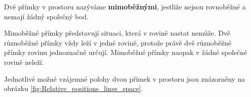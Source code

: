 \begin{definition}
    \label{def:Skew_lines_space}
    Dvě přímky v prostoru nazýváme \textbf{mimoběžnými}, jestliže
    nejsou rovnoběžné a nemají žádný společný bod.
\end{definition}

Mimoběžné přímky představují situaci, která v rovině nastat nemůže.
Dvě různoběžné přímky vždy leží v jedné rovině, protože právě dvě
různoběžné přímky rovinu jednoznačně určují. Mimoběžné přímky naopak
v žádné společné rovině neleží.

Jednotlivé možné vzájemné polohy dvou přímek v prostoru jsou
znázorněny na obrázku
\ref{fig:Relative_positions_lines_space}.

\begin{figure}[H]
    \centering


    \newcommand{\DrawSpaceBase}{%
        \fill[plane] (0,0,0) -- (5,0,0) -- (5,0,3.4) -- (0,0,3.4) -- cycle;
        \node[below right, font=\small] at (3.4,0,3.15) {rovina $xz$ $(y=0)$};

        \draw[->] (0,0,0) -- (5.6,0,0) node[right] {$x$};
        \draw[->] (0,0,0) -- (0,4.2,0) node[above] {$y$};
        \draw[->] (0,0,0) -- (0,0,4.1) node[below left] {$z$};

        \draw[->, dashed] (0,0,0) -- (-1.1,0,0);
        \draw[->, dashed] (0,0,0) -- (0,-1.0,0);
        \draw[->, dashed] (0,0,0) -- (0,0,-1.0);

        \node[below left] at (0,0,0) {$O$};
    }

    \begin{minipage}{0.48\textwidth}
        \centering
\end{minipage}
\end{figure}
